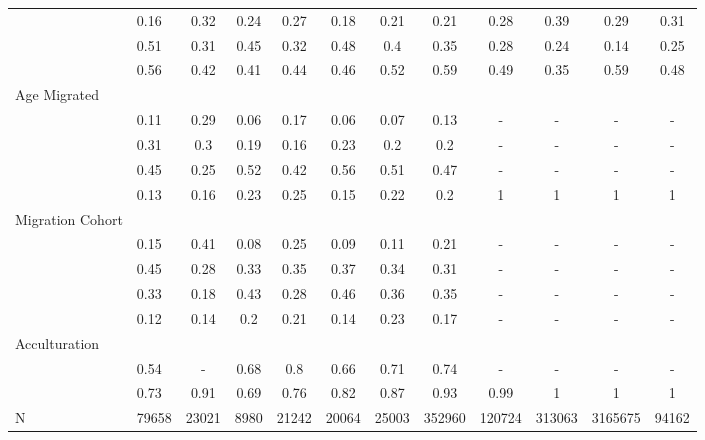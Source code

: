 \begin{table}[ht]
\begin{tabular}{>{\raggedright\arraybackslash}p{3.2cm}|lcccccc|cccc}
  \multicolumn{1}{>{\raggedleft\arraybackslash}p{2.2cm}|}{\makebox[2.2cm][r]{Lives Alone }}& 0.16 & 0.32 & 0.24 & 0.27 & 0.18 & 0.21 & 0.21 & 0.28 & 0.39 & 0.29 & 0.31 \\ 
  \multicolumn{1}{>{\raggedleft\arraybackslash}p{2.9cm}|}{\makebox[2.9cm][r]{Lives with Child }}& 0.51 & 0.31 & 0.45 & 0.32 & 0.48 & 0.4 & 0.35 & 0.28 & 0.24 & 0.14 & 0.25 \\ 
  \multicolumn{1}{>{\raggedleft\arraybackslash}p{3.4cm}|}{\makebox[3.4cm][r]{Married/Cohabiting }}& 0.56 & 0.42 & 0.41 & 0.44 & 0.46 & 0.52 & 0.59 & 0.49 & 0.35 & 0.59 & 0.48 \\ 
  Age Migrated &  &  &  &  &  &  &  &  &  &  &  \\ 
  \multicolumn{1}{>{\raggedleft\arraybackslash}p{2.4cm}|}{\makebox[2.4cm][r]{Less than 15 }}& 0.11 & 0.29 & 0.06 & 0.17 & 0.06 & 0.07 & 0.13 & - & - & - & - \\ 
  \multicolumn{1}{>{\raggedleft\arraybackslash}p{1.6cm}|}{\makebox[1.6cm][r]{15 - 23 }}& 0.31 & 0.3 & 0.19 & 0.16 & 0.23 & 0.2 & 0.2 & - & - & - & - \\ 
  \multicolumn{1}{>{\raggedleft\arraybackslash}p{1.6cm}|}{\makebox[1.6cm][r]{24 - 49 }}& 0.45 & 0.25 & 0.52 & 0.42 & 0.56 & 0.51 & 0.47 & - & - & - & - \\ 
  \multicolumn{1}{>{\raggedleft\arraybackslash}p{2.6cm}|}{\makebox[2.6cm][r]{50 and Above }}& 0.13 & 0.16 & 0.23 & 0.25 & 0.15 & 0.22 & 0.2 & 1 & 1 & 1 & 1 \\ 
  Migration Cohort &  &  &  &  &  &  &  &  &  &  &  \\ 
  \multicolumn{1}{>{\raggedleft\arraybackslash}p{2.3cm}|}{\makebox[2.3cm][r]{Before 1965 }}& 0.15 & 0.41 & 0.08 & 0.25 & 0.09 & 0.11 & 0.21 & - & - & - & - \\ 
  \multicolumn{1}{>{\raggedleft\arraybackslash}p{2.2cm}|}{\makebox[2.2cm][r]{1965 - 1979 }}& 0.45 & 0.28 & 0.33 & 0.35 & 0.37 & 0.34 & 0.31 & - & - & - & - \\ 
  \multicolumn{1}{>{\raggedleft\arraybackslash}p{2.2cm}|}{\makebox[2.2cm][r]{1980 - 1999 }}& 0.33 & 0.18 & 0.43 & 0.28 & 0.46 & 0.36 & 0.35 & - & - & - & - \\ 
  \multicolumn{1}{>{\raggedleft\arraybackslash}p{2.1cm}|}{\makebox[2.1cm][r]{After 1999 }}& 0.12 & 0.14 & 0.2 & 0.21 & 0.14 & 0.23 & 0.17 & - & - & - & - \\ 
  Acculturation &  &  &  &  &  &  &  &  &  &  &  \\ 
  \multicolumn{1}{>{\raggedleft\arraybackslash}p{1.6cm}|}{\makebox[1.6cm][r]{Citizen }}& 0.54 & - & 0.68 & 0.8 & 0.66 & 0.71 & 0.74 & - & - & - & - \\ 
  \multicolumn{1}{>{\raggedleft\arraybackslash}p{3cm}|}{\makebox[3cm][r]{English Speakers }}& 0.73 & 0.91 & 0.69 & 0.76 & 0.82 & 0.87 & 0.93 & 0.99 & 1 & 1 & 1 \\ 
  N & 79658 & 23021 & 8980 & 21242 & 20064 & 25003 & 352960 & 120724 & 313063 & 3165675 & 94162 \\ 
   \hline
\end{tabular}
\endgroup
\end{table}
